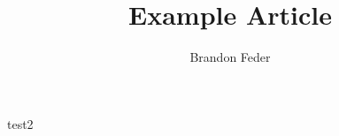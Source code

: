 \documentclass{article}
\title{Example Article}
\author{Brandon Feder}
\begin{document}
test2




















\end{document}
